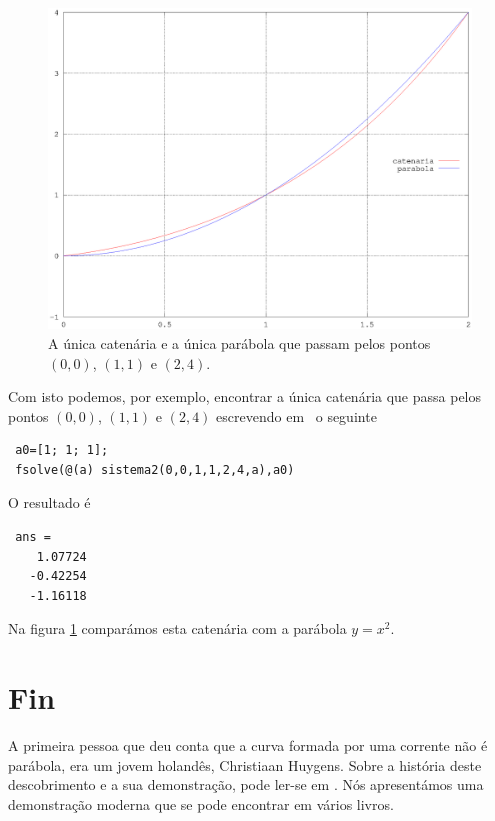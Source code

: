 \begin{figure}
      \vspace{-10pt}
  \begin{figurebox}
      \centering
      \includegraphics[width=\textwidth]{catenariaVsParabola}
      \caption{A única catenária e a única parábola que passam pelos
        pontos $(0,0)$, $(1,1)$ e $(2,4)$.}
    \label{fig:6}
  \end{figurebox}
    \vspace{-180pt}
\end{figure}

Com isto podemos, por exemplo, encontrar a única catenária que passa pelos pontos $(0,0)$, $(1,1)$ e $(2,4)$ escrevendo em \Octave\ o seguinte
\begin{octaveboxI}
\begin{verbatim}
 a0=[1; 1; 1];
 fsolve(@(a) sistema2(0,0,1,1,2,4,a),a0)
\end{verbatim}
\end{octaveboxI}
O resultado é
\begin{octaveboxI}
\begin{verbatim}
 ans =
    1.07724
   -0.42254
   -1.16118
\end{verbatim}
\end{octaveboxI}
Na figura \ref{fig:6} comparámos esta catenária com a parábola $y=x^2$.

\section{Fin}
\label{sec:fin}

A primeira pessoa que deu conta que a curva formada por uma
corrente não é parábola, era um jovem holandês, Christiaan Huygens. Sobre
a história deste descobrimento e a sua demonstração, pode ler-se em
\cite{Buk08}. Nós apresentámos uma demonstração moderna que
se pode encontrar em vários livros.




\newpage
